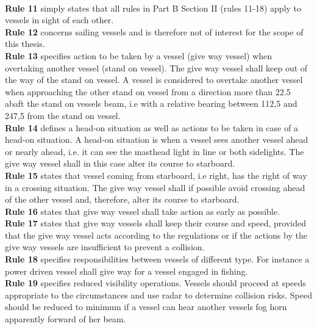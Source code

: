 \\
\textbf{Rule 11} simply states that all rules in Part B Section II (rules 11-18) apply to vessels in sight of each other.
\\
\textbf{Rule 12} concerns sailing vessels and is therefore not of interest for the scope of this thesis.
\\
\textbf{Rule 13} specifies action to be taken by a vessel (give way vessel) when overtaking another vessel (stand on vessel). The give way vessel shall keep out of the way of the stand on vessel. A vessel is considered to overtake another vessel when approaching the other stand on vessel from a direction more than 22.5 \textdegree abaft the stand on vessels beam, i.e with a relative bearing between 112,5 \textdegree and 247,5 \textdegree from the stand on vessel.
\\
\textbf{Rule 14} defines a head-on situation as well as actions to be taken in case of a head-on situation. A head-on situation is when a vessel sees another vessel ahead or nearly ahead, i.e. it can see the masthead light in line or both sidelights. The give way vessel shall in this case alter its course to starboard.
\\
\textbf{Rule 15} states that vessel coming from starboard, i.e right, has the right of way in a crossing situation. The give way vessel shall if possible avoid crossing ahead of the other vessel and, therefore, alter its course to starboard.
\\
\textbf{Rule 16} states that give way vessel shall take action as early as possible.
\\
\textbf{Rule 17} states that give way vessels shall keep their course and speed, provided that the give way vessel acts according to the regulations or if the actions by the give way vessels are insufficient to prevent a collision.
\\
\textbf{Rule 18} specifies responsibilities between vessels of different type. For instance a power driven vessel shall give way for a vessel engaged in fishing.
\\
\textbf{Rule 19} specifies reduced visibility operations. Vessels should proceed at speeds appropriate to the circumstances and use radar to determine collision risks. Speed should be reduced to minimum if a vessel can hear another vessels fog horn apparently forward of her beam.


